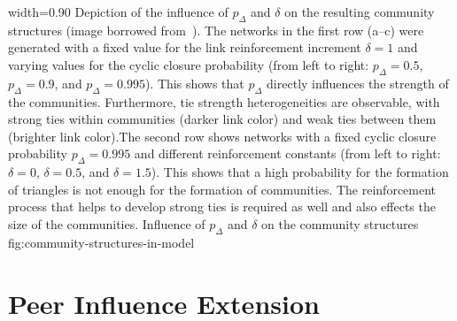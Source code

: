       {width=0.90\textwidth}
      {Depiction of the influence of \( p_{\Delta} \) and \( \delta \) on the resulting community structures (image borrowed from~\cite{Laurent2015}). The networks in the first row (a--c) were generated with a fixed value for the link reinforcement increment \(\delta = 1\) and varying values for the cyclic closure probability (from left to right: \( p_{\Delta} = 0.5 \), \( p_{\Delta} = 0.9 \), and \( p_{\Delta} = 0.995 \)). This shows that \( p_{\Delta} \) directly influences the strength of the communities. Furthermore, tie strength heterogeneities are observable, with strong ties within communities (darker link color) and weak ties between them (brighter link color).The second row shows networks with a fixed cyclic closure probability \( p_{\Delta} = 0.995 \) and different reinforcement constants (from left to right: \(\delta = 0\), \(\delta = 0.5\), and \(\delta = 1.5\)). This shows that a high probability for the formation of triangles is not enough for the formation of communities. The reinforcement process that helps to develop strong ties is required as well and also effects the size of the communities.}
      {Influence of \( p_{\Delta} \) and \( \delta \) on the community structures}
      {fig:community-structures-in-model}




\section{Peer Influence Extension}
\label{sec:peer-influence-model}

